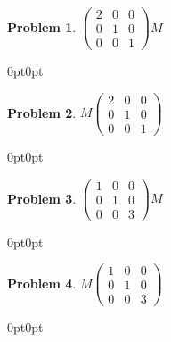 \documentclass[12pt]{article}
\newenvironment{answer}
    {\begin{adjustwidth}{0pt}{0pt}}
    {\end{adjustwidth}}
\newtheorem{problem}{Problem}
\theoremstyle{remark}  %
\begin{document}
    \begin{problem} $
        \begin{pmatrix}
            2 & 0 & 0 \\
            0 & 1 & 0 \\
            0 & 0 & 1
        \end{pmatrix} M
        $
    \end{problem}
    \begin{answer}
        
    \end{answer}
    \begin{problem} $ M
        \begin{pmatrix}
            2 & 0 & 0 \\
            0 & 1 & 0 \\
            0 & 0 & 1
        \end{pmatrix}
        $
    \end{problem}
    \begin{answer}
        
    \end{answer}
    \begin{problem} $
        \begin{pmatrix}
            1 & 0 & 0 \\
            0 & 1 & 0 \\
            0 & 0 & 3
        \end{pmatrix} M
        $
    \end{problem}
    \begin{answer}
        
    \end{answer}
\begin{problem} $ M
    \begin{pmatrix}
        1 & 0 & 0 \\
        0 & 1 & 0 \\
        0 & 0 & 3
    \end{pmatrix}
    $
\end{problem}
\begin{answer}
    
\end{answer}
\end{document}
